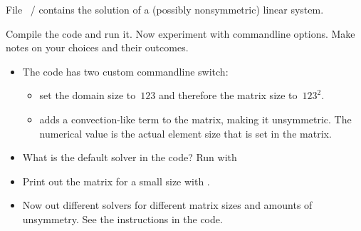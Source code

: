 \begin{exerciseframe}[ksp]
  File ~/  contains the solution of a (possibly
  nonsymmetric) linear system.

  Compile the code and run it. Now experiment with commandline
  options. Make notes on your choices and their outcomes.
  \begin{itemize}
  \item The code has two custom commandline switch:
    \begin{itemize}
    \item {} set the domain size to~$123$ and therefore the
      matrix size to~$123^2$.
    \item {} adds a convection-like term to the
      matrix, making it unsymmetric. The numerical value is the actual
      element size that is set in the matrix.
    \end{itemize}
  \item What is the default solver in the code? Run with 
  \item Print out the matrix for a small size with .
  \item Now out different solvers for different matrix sizes and
    amounts of unsymmetry. See the instructions in the code.
  \end{itemize}
\end{exerciseframe}

